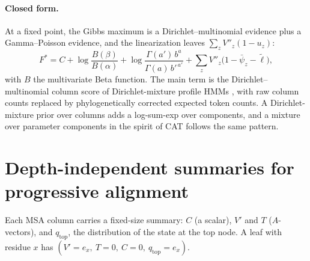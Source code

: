 \documentclass[11pt]{article}
\begin{document}
\paragraph{Closed form.} At a fixed point, the Gibbs maximum is a
Dirichlet--multinomial evidence plus a Gamma--Poisson evidence, and the
linearization leaves $\sum_zV''_z(1-u_z)$:
\begin{equation}\label{eq:closed}
F^*=C+\log\frac{B(\beta)}{B(\alpha)}
 +\log\frac{\Gamma(a')\,b^{a}}{\Gamma(a)\,b'^{\,a'}}
 +\sum_zV''_z\big(1-\bar\psi_z-\tilde\ell\big),
\end{equation}
with $B$ the multivariate Beta function. The main term is the
Dirichlet--multinomial column score of Dirichlet-mixture profile HMMs
\citep{Sjolander1996}, with raw column counts replaced by phylogenetically
corrected expected token counts. A Dirichlet-mixture prior over columns adds a
log-sum-exp over components, and a mixture over parameter components in the
spirit of CAT \citep{Lartillot2004} follows the same pattern.

\section{Depth-independent summaries for progressive alignment}

Each MSA column carries a fixed-size summary: $C$ (a scalar), $V'$ and $T$
($A$-vectors), and $q_{\mathrm{top}}$, the distribution of the state at the top
node. A leaf with residue $x$ has
$(V'=e_x,\ T=0,\ C=0,\ q_{\mathrm{top}}=e_x)$.
\end{document}
